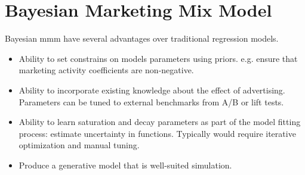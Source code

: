 \section{Bayesian Marketing Mix Model}

Bayesian mmm have several advantages over traditional
regression models. 

\begin{itemize}[noitemsep]
    \item Ability to set constrains on models parameters using priors. 
        e.g. ensure that marketing activity coefficients are non-negative.
    \item Ability to incorporate existing knowledge about the effect of 
        advertising. Parameters can be tuned to external benchmarks from A/B
        or lift tests.
    \item Ability to learn saturation and decay parameters as part of the 
        model fitting process: estimate uncertainty in functions.
        Typically would require iterative optimization and manual tuning.
    \item Produce a generative model that is well-suited simulation.
\end{itemize}
